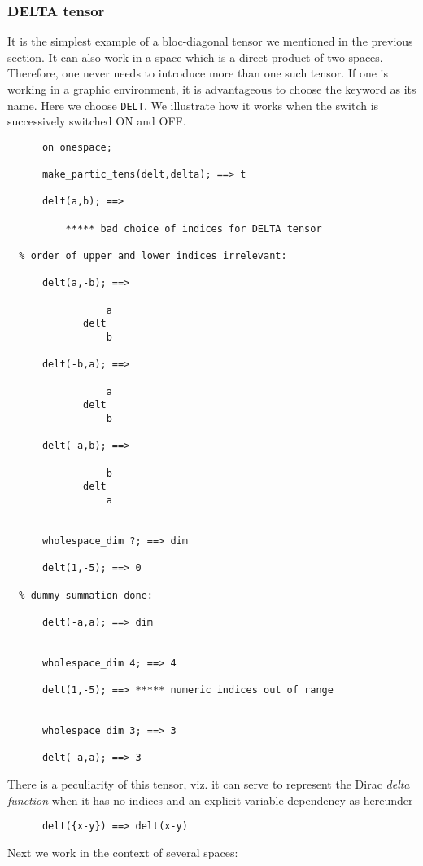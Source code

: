 \subsubsection{ DELTA tensor}
It is the simplest example of a bloc-diagonal
tensor we mentioned in the
previous section. It can also work in a space which is a direct product
of two spaces. Therefore, one never needs to introduce more than one 
such tensor. If one is working in a graphic environment, it is advantageous 
to choose the keyword as its name. Here we choose \texttt{DELT}.
We illustrate how it works  when the switch  is 
successively switched ON and OFF.
\begin{verbatim}
      on onespace;

      make_partic_tens(delt,delta); ==> t

      delt(a,b); ==> 

          ***** bad choice of indices for DELTA tensor

  % order of upper and lower indices irrelevant:    

      delt(a,-b); ==>

                 a
             delt
                 b

      delt(-b,a); ==>

                 a
             delt
                 b
     
      delt(-a,b); ==>

                 b
             delt
                 a


      wholespace_dim ?; ==> dim

      delt(1,-5); ==> 0

  % dummy summation done:   

      delt(-a,a); ==> dim


      wholespace_dim 4; ==> 4

      delt(1,-5); ==> ***** numeric indices out of range


      wholespace_dim 3; ==> 3

      delt(-a,a); ==> 3
\end{verbatim}
There is a peculiarity of this tensor, viz. it can serve to represent 
the Dirac \emph{delta function}
 when it has no indices and an explicit variable dependency as hereunder
\begin{verbatim}
      delt({x-y}) ==> delt(x-y)
\end{verbatim}
Next we work in the context of several spaces:
